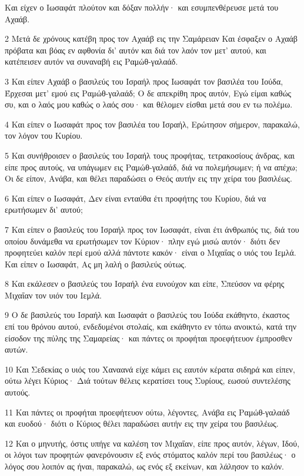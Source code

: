 \par Και είχεν ο Ιωσαφάτ πλούτον και δόξαν πολλήν· και εσυμπενθέρευσε μετά του Αχαάβ.
\par 2 Μετά δε χρόνους κατέβη προς τον Αχαάβ εις την Σαμάρειαν Και έσφαξεν ο Αχαάβ πρόβατα και βόας εν αφθονία δι' αυτόν και διά τον λαόν τον μετ' αυτού, και κατέπεισεν αυτόν να συναναβή εις Ραμώθ-γαλαάδ.
\par 3 Και είπεν Αχαάβ ο βασιλεύς του Ισραήλ προς Ιωσαφάτ τον βασιλέα του Ιούδα, Έρχεσαι μετ' εμού εις Ραμώθ-γαλαάδ; Ο δε απεκρίθη προς αυτόν, Εγώ είμαι καθώς συ, και ο λαός μου καθώς ο λαός σου· και θέλομεν είσθαι μετά σου εν τω πολέμω.
\par 4 Και είπεν ο Ιωσαφάτ προς τον βασιλέα του Ισραήλ, Ερώτησον σήμερον, παρακαλώ, τον λόγον του Κυρίου.
\par 5 Και συνήθροισεν ο βασιλεύς του Ισραήλ τους προφήτας, τετρακοσίους άνδρας, και είπε προς αυτούς, να υπάγωμεν εις Ραμώθ-γαλαάδ, διά να πολεμήσωμεν; ή να απέχω; Οι δε είπον, Ανάβα, και θέλει παραδώσει ο Θεός αυτήν εις την χείρα του βασιλέως.
\par 6 Και είπεν ο Ιωσαφάτ, Δεν είναι ενταύθα έτι προφήτης του Κυρίου, διά να ερωτήσωμεν δι' αυτού;
\par 7 Και είπεν ο βασιλεύς του Ισραήλ προς τον Ιωσαφάτ, είναι έτι άνθρωπός τις, διά του οποίου δυνάμεθα να ερωτήσωμεν τον Κύριον· πλην εγώ μισώ αυτόν· διότι δεν προφητεύει καλόν περί εμού αλλά πάντοτε κακόν· είναι ο Μιχαΐας ο υιός του Ιεμλά. Και είπεν ο Ιωσαφάτ, Ας μη λαλή ο βασιλεύς ούτως.
\par 8 Και εκάλεσεν ο βασιλεύς του Ισραήλ ένα ευνούχον και είπε, Σπεύσον να φέρης Μιχαΐαν τον υιόν του Ιεμλά.
\par 9 Ο δε βασιλεύς του Ισραήλ και Ιωσαφάτ ο βασιλεύς του Ιούδα εκάθηντο, έκαστος επί του θρόνου αυτού, ενδεδυμένοι στολαίς, και εκάθηντο εν τόπω ανοικτώ, κατά την είσοδον της πύλης της Σαμαρείας· και πάντες οι προφήται προεφήτευον έμπροσθεν αυτών.
\par 10 Και Σεδεκίας ο υιός του Χαναανά είχε κάμει εις εαυτόν κέρατα σιδηρά και είπεν, ούτω λέγει Κύριος· Διά τούτων θέλεις κερατίσει τους Συρίους, εωσού συντελέσης αυτούς.
\par 11 Και πάντες οι προφήται προεφήτευον ούτω, λέγοντες, Ανάβα εις Ραμώθ-γαλαάδ και ευοδού· διότι ο Κύριος θέλει παραδώσει αυτήν εις την χείρα του βασιλέως.
\par 12 Και ο μηνυτής, όστις υπήγε να καλέση τον Μιχαΐαν, είπε προς αυτόν, λέγων, Ιδού, οι λόγοι των προφητών φανερόνουσιν εξ ενός στόματος καλόν περί του βασιλέως· ο λόγος σου λοιπόν ας ήναι, παρακαλώ, ως ενός εξ εκείνων, και λάλησον το καλόν.
